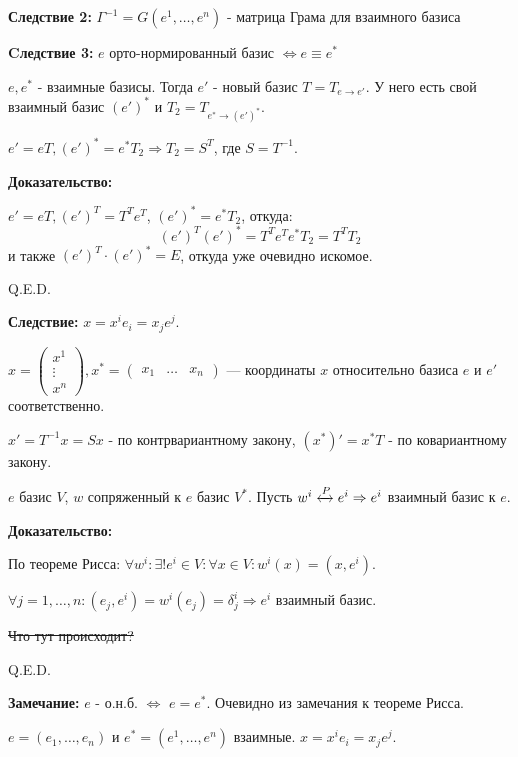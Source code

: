 \textbf{Следствие 2:} $\Gamma^{-1} = G(e^1,\ldots, e^n)$ - матрица Грама для взаимного базиса

\textbf{Cледствие 3:} $e$ орто-нормированный базис $\Leftrightarrow e \equiv e^*$


$e, e^*$ - взаимные базисы. Тогда $e'$ - новый базис $T = T_{e\rightarrow e'}$.  У него есть свой взаимный базис  $(e')^*$ и $T_2 =T_{e^*\rightarrow (e')^*}$.

$e' = eT, (e')^* = e^* T_2 \Rightarrow T_2 = S^T$, где $S = T^{-1}$.


\textbf{Доказательство:}

$e' = eT, (e')^T = T^Te^T$, $(e')^* = e^* T_2$, откуда:
$$(e')^T (e')^* =   T^T e^T e^* T_2 =T^T T_2$$
и также $(e')^T \cdot (e')^* = E$, откуда уже очевидно искомое.

\hfill Q.E.D.


\textbf{Следствие:} $x = x^i e_i = x_je^j$.

$x = \begin{pmatrix}
    x^1 \\
    \vdots \\
    x^n
\end{pmatrix}, x^* = \begin{pmatrix}
    x_1 & \ldots & x_n
\end{pmatrix}$ --- координаты $x$ относительно базиса $e$ и $e'$ соответственно.

$x' = T^{-1} x =Sx$ - по контрвариантному закону, $(x^*)' = x^*T$ - по ковариантному закону.


$e$ базис $V$, $w$ сопряженный к $e$ базис $V^*$. Пусть $w^i \xleftrightarrow{P}e^i \Rightarrow e^i$ взаимный базис к $e$. 

\textbf{ Доказательство:}

По теореме Рисса: $\forall w^i:\exists! e^i \in V: \forall x \in V: w^i(x) =(x,e^i)$.

$\forall j = 1,\ldots, n: (e_j,e^i) = w^i(e_j) = \delta_j^i \Rightarrow e^i$ взаимный базис.

\sout{Что тут происходит?}

\hfill Q.E.D.

\textbf{Замечание:} $e$ - о.н.б. $\Leftrightarrow$ $e = e^*$. Очевидно из замечания к теореме Рисса.

$e =(e_1,\ldots, e_n)$ и $e^* =(e^1,\ldots, e^n)$ взаимные. $x = x^ie_i =x_je^j$.

